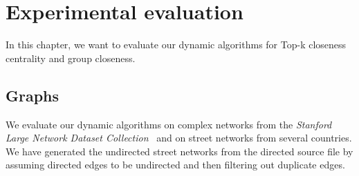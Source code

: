 \chapter{Experimental evaluation}
\label{ch:experiments}

In this chapter, we want to evaluate our dynamic algorithms for Top-k closeness centrality and group closeness. 

\section{Graphs}
We evaluate our dynamic algorithms on complex networks from the \emph{Stanford Large Network Dataset Collection}~\cite{snapnets} and on street networks from several countries. We have generated the undirected street networks from the directed source file by assuming directed edges to be undirected and then filtering out duplicate edges.

